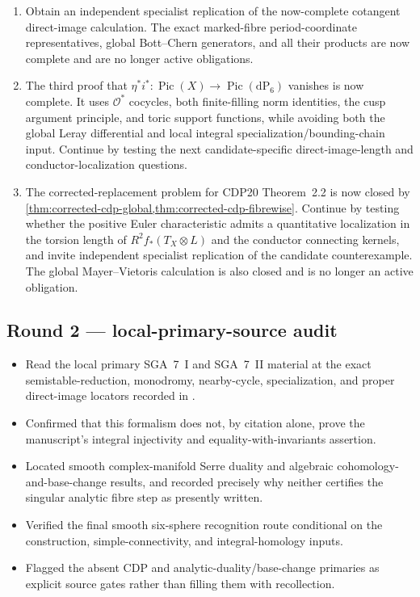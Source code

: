 \begin{enumerate}[leftmargin=1.8em]
\item Obtain an independent specialist replication of the now-complete
cotangent direct-image calculation.  The exact marked-fibre
period-coordinate representatives, global Bott--Chern generators, and all
their products are now complete and are no longer active obligations.
\item The third proof that
\(\eta^*i^*:\operatorname{Pic}(X)\to\operatorname{Pic}(\mathrm{dP}_6)\)
vanishes is now complete.  It uses $\mathcal O^*$ cocycles, both finite-filling
norm identities, the cusp argument principle, and toric support functions,
while avoiding both the global Leray differential and local integral
specialization/bounding-chain input.  Continue by testing the next
candidate-specific direct-image-length and conductor-localization questions.
\item The corrected-replacement problem for CDP20 Theorem~2.2 is now closed
by \cref{thm:corrected-cdp-global,thm:corrected-cdp-fibrewise}.  Continue by
testing whether the positive Euler characteristic admits a quantitative
localization in the torsion length of \(R^2f_*(T_X\otimes L)\) and the
conductor connecting kernels, and invite independent specialist replication
of the candidate counterexample.  The global Mayer--Vietoris calculation is
also closed and is no longer an active obligation.
\end{enumerate}

\subsection*{Round 2 --- local-primary-source audit}

\begin{itemize}[leftmargin=1.8em]
\item Read the local primary SGA~7~I and SGA~7~II material at the exact
semistable-reduction, monodromy, nearby-cycle, specialization, and proper
direct-image locators recorded in
.
\item Confirmed that this formalism does not, by citation alone, prove the
manuscript's integral injectivity and equality-with-invariants assertion.
\item Located smooth complex-manifold Serre duality and algebraic
cohomology-and-base-change results, and recorded precisely why neither
certifies the singular analytic fibre step as presently written.
\item Verified the final smooth six-sphere recognition route conditional on
the construction, simple-connectivity, and integral-homology inputs.
\item Flagged the absent CDP and analytic-duality/base-change primaries as
explicit source gates rather than filling them with recollection.
\end{itemize}

